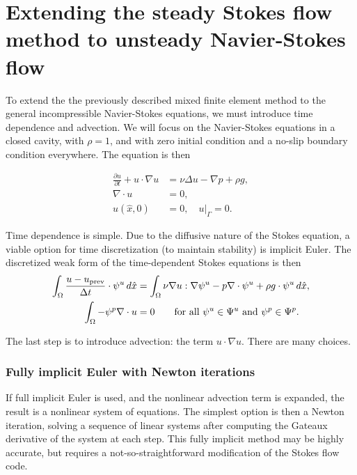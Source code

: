 \section{Extending the steady Stokes flow method to unsteady Navier-Stokes flow}

To extend the the previously described mixed finite element method to the general incompressible Navier-Stokes equations,
we must introduce time dependence and advection. We will focus on the Navier-Stokes equations in a closed cavity, with $\rho = 1$, and with zero initial condition and
a no-slip boundary condition everywhere. The equation is then

\begin{equation}\label{navier_stokes_ibvp}
\begin{split}
    \frac{\partial u}{\partial t} + u\cdot\nabla u &= \nu\Delta u - \nabla p + \rho g,\\
    \nabla\cdot u &= 0,\\
    u(\hat{x}, 0) &= 0, \quad \left.u\right|_\Gamma = 0.
\end{split}
\end{equation}

Time dependence is simple. Due to the diffusive nature of the Stokes equation, a viable option for time discretization (to maintain stability) is implicit Euler.
The discretized weak form of the time-dependent Stokes equations is then
\newcommand{\uprev}{{u_{\text{prev}}}}
\begin{equation}
\begin{split}
    \int_\om \frac{u - \uprev}{\Delta t}\cdot \psi^u\,d\hat{x}
        &= \int_\om \nu \nabla u : \nabla \psi^u - p\nabla\cdot \psi^u + \rho g \cdot \psi^u\,d\hat{x},\\
    \int_\om -\psi^p \nabla\cdot u &= 0 \text{\quad\quad for all $\psi^u \in \Psi^u$ and $\psi^p \in \Psi^p$.}
\end{split}
\end{equation}

The last step is to introduce advection: the term $u\cdot \nabla u$. There are many choices.
\subsubsection{Fully implicit Euler with Newton iterations}
If full implicit Euler is used, and the nonlinear advection term is expanded, the result is a nonlinear system of equations.
The simplest option is then a Newton iteration, solving a sequence of linear systems after computing the Gateaux derivative of the system
at each step. This fully implicit method may be highly accurate, but requires a not-so-straightforward modification of the Stokes flow code.

